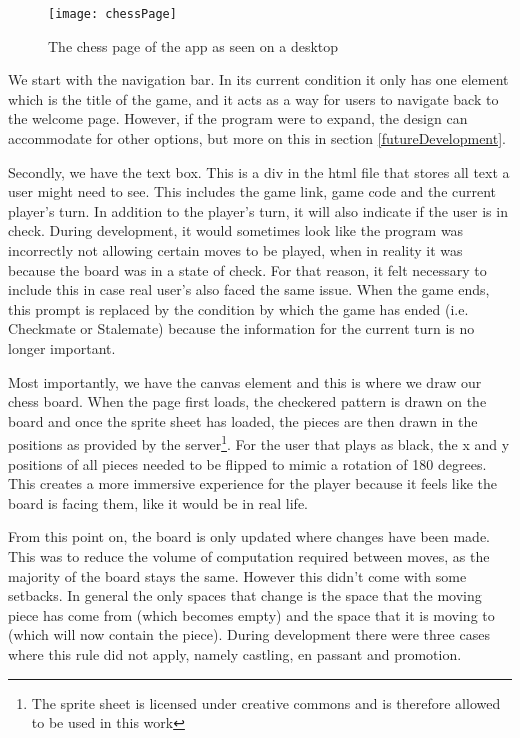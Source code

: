 \begin{figure}
    \begin{center}
        \texttt{[image: chessPage]}
        \caption{The chess page of the app as seen on a desktop}
    \end{center}
\end{figure}

We start with the navigation bar. In its current condition it only has one element which is the title of the game, and it acts as a way for users to navigate back to the welcome page. However, if the program were to expand, the design can accommodate for other options, but more on this in section \ref{futureDevelopment}.

Secondly, we have the text box. This is a div in the html file that stores all text a user might need to see. This includes the game link, game code and the current player's turn. In addition to the player's turn, it will also indicate if the user is in check. During development, it would sometimes look like the program was incorrectly not allowing certain moves to be played, when in reality it was because the board was in a state of check. For that reason, it felt necessary to include this in case real user's also faced the same issue. When the game ends, this prompt is replaced by the condition by which the game has ended (i.e. Checkmate or Stalemate) because the information for the current turn is no longer important.

Most importantly, we have the canvas element and this is where we draw our chess board. When the page first loads, the checkered pattern is drawn on the board and once the sprite sheet \cite{SpriteSheet} has loaded, the pieces are then drawn in the positions as provided by the server\footnote{The sprite sheet is licensed under creative commons and is therefore allowed to be used in this work}. For the user that plays as black, the x and y positions of all pieces needed to be flipped to mimic a rotation of 180 degrees. This creates a more immersive experience for the player because it feels like the board is facing them, like it would be in real life.

From this point on, the board is only updated where changes have been made. This was to reduce the volume of computation required between moves, as the majority of the board stays the same. However this didn't come with some setbacks. In general the only spaces that change is the space that the moving piece has come from (which becomes empty) and the space that it is moving to (which will now contain the piece). During development there were three cases where this rule did not apply, namely castling, en passant and promotion.

